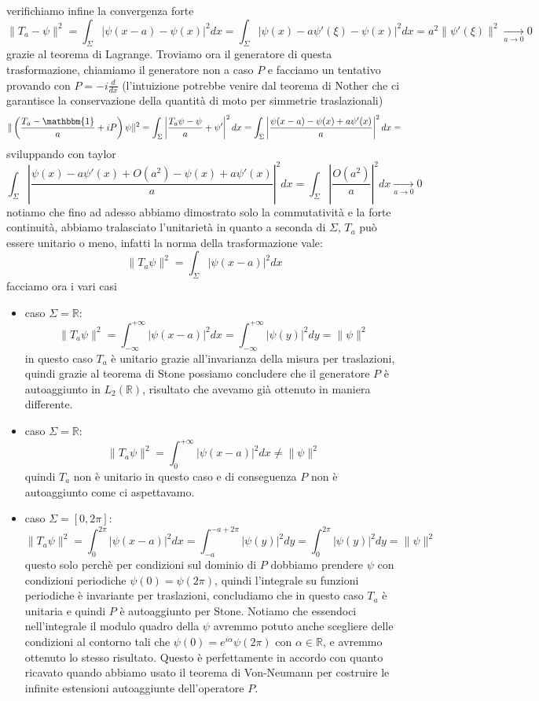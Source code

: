 \documentclass[12pt]{book}
\theoremstyle{plain}
\newcommand{\R}{\mathbb{R}}
\theoremstyle{definition}
\theoremstyle{remark}
\begin{document}
verifichiamo infine la convergenza forte
\[\|T_a-\psi\|^2 = \int_\Sigma|\psi(x-a)-\psi(x)|^2dx = \int_\Sigma |\psi(x)-a\psi'(\xi) -\psi(x)|^2dx = a^2\|\psi'(\xi)\|^2\xrightarrow[a\to0]{}0\]
grazie al teorema di Lagrange. Troviamo ora il generatore di questa trasformazione, chiamiamo il generatore non a caso $P$ e facciamo un tentativo provando con $P = -i\frac{d}{dx}$ (l'intuizione potrebbe venire dal teorema di Nother che ci garantisce la conservazione della quantità di moto per simmetrie traslazionali)
\[ \|\left(\frac{T_a-\mathbbm{1}}{a} +iP\right)\psi\|^2 = \int_\Sigma \left|\frac{T_a\psi-\psi}{a} +\psi' \right|^2dx = \int_\Sigma \left|\frac{\psi(x-a)-\psi(x) +a \psi'(x)}{a}\right|^2dx = \]
sviluppando con taylor
\[\int_\Sigma \left|\frac{\psi(x)-a\psi'(x) +O(a^2) -\psi(x)+  a \psi'(x)}{a}\right|^2dx = \int_\Sigma \left|\frac{O(a^2)}{a}\right|^2dx\xrightarrow[a\to0]{}  0\]
notiamo che fino ad adesso abbiamo dimostrato solo la commutatività e la forte continuità, abbiamo tralasciato l'unitarietà in quanto a seconda di $\Sigma$, $T_a$ può essere unitario o meno, infatti la norma della trasformazione vale:
\[\|T_a\psi\|^2 = \int_\Sigma|\psi(x-a)|^2dx\]
facciamo ora i vari casi
\begin{itemize}
\item caso $\Sigma=\R$:
\[\|T_a\psi\|^2 = \int_{-\infty}^{+\infty}|\psi(x-a)|^2dx = \int_{-\infty}^{+\infty}|\psi(y)|^2dy = \|\psi\|^2\]
in questo caso $T_a$ è unitario grazie all'invarianza della misura per traslazioni, quindi grazie al teorema di Stone possiamo concludere che il generatore $P$ è autoaggiunto in $L_2(\R)$, risultato che avevamo già ottenuto in maniera differente.
\item caso $\Sigma=\R$:
\[\|T_a\psi\|^2 = \int_{0}^{+\infty}|\psi(x-a)|^2dx \neq \|\psi\|^2\]
quindi $T_a$ non è unitario in questo caso e di conseguenza $P$ non è autoaggiunto come ci aspettavamo.
\item caso $\Sigma=[0,2\pi]$:
\[\|T_a\psi\|^2 = \int_{0}^{2\pi}|\psi(x-a)|^2dx = \int_{-a}^{-a+2\pi}|\psi(y)|^2dy =\int_{0}^{2\pi}|\psi(y)|^2dy =\|\psi\|^2\]
questo solo perchè per condizioni sul dominio di $P$ dobbiamo prendere $\psi$ con condizioni periodiche $\psi(0) = \psi(2\pi)$, quindi l'integrale su funzioni periodiche è invariante per traslazioni, concludiamo che in questo caso $T_a$ è unitaria e quindi $P$ è autoaggiunto per Stone. Notiamo che essendoci nell'integrale il modulo quadro della $\psi$ avremmo potuto anche scegliere delle condizioni al contorno tali che $\psi(0) = e^{i\alpha}\psi(2\pi)$ con $\alpha\in\R$, e avremmo ottenuto lo stesso risultato. Questo è perfettamente in accordo con quanto ricavato quando abbiamo usato il teorema di Von-Neumann per costruire le infinite estensioni autoaggiunte dell'operatore $P$.
\end{itemize}
\end{document}
